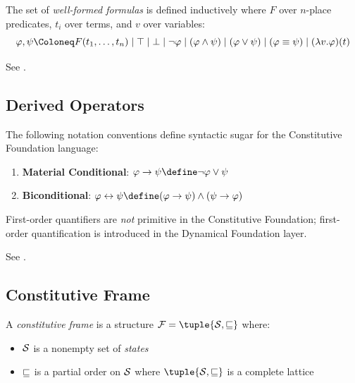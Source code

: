 \documentclass[../LogosReference.tex]{subfiles}
\begin{document}
\begin{definition}\label{def:wff}
The set of \emph{well-formed formulas} is defined inductively where $F$ over $n$-place predicates, $t_i$ over terms, and $v$ over variables:
  \[
    \metaA, \metaB \Define{}
      F(t_1, \ldots, t_n) \mid
      \top \mid \bot \mid
      \neg\metaA \mid
      (\metaA \land \metaB) \mid
      (\metaA \lor \metaB) \mid
      (\metaA \equiv \metaB) \mid
      (\lambda v.\metaA)(t)
  \]
\end{definition}

\noindent
See .

\subsection{Derived Operators}\label{sec:derived-operators}

\begin{definition}\label{def:derived-operators}
The following notation conventions define syntactic sugar for the Constitutive Foundation language:
\begin{enumerate}
	\item \textbf{Material Conditional}: $\metaA \to \metaB \define \neg\metaA \lor \metaB$
	\item \textbf{Biconditional}: $\metaA \leftrightarrow \metaB \define (\metaA \to \metaB) \land (\metaB \to \metaA)$
\end{enumerate}
First-order quantifiers are \textit{not} primitive in the Constitutive Foundation; first-order quantification is introduced in the Dynamical Foundation layer.
\end{definition}

\noindent
See .


\subsection{Constitutive Frame}\label{sec:constitutive-frame}

\begin{definition}\label{def:constitutive-frame}
	A \emph{constitutive frame} is a structure $\mframe = \tuple{\statespace, \parthood}$ where:
	\begin{itemize}
		\item $\mathcal{S}$ is a nonempty set of \emph{states}
		\item $\sqsubseteq$ is a partial order on $\mathcal{S}$ where $\tuple{\statespace, \parthood}$ is a complete lattice
	\end{itemize}
\end{definition}
\end{document}
